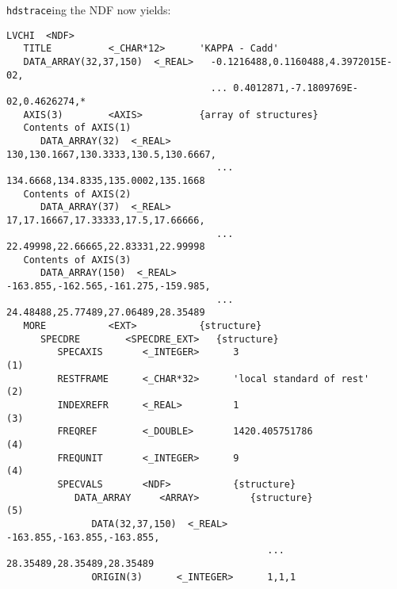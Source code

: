 {\tt hdstrace}ing the NDF now yields:

\small
\begin{verbatim}
LVCHI  <NDF>
   TITLE          <_CHAR*12>      'KAPPA - Cadd'
   DATA_ARRAY(32,37,150)  <_REAL>   -0.1216488,0.1160488,4.3972015E-02,
                                    ... 0.4012871,-7.1809769E-02,0.4626274,*
   AXIS(3)        <AXIS>          {array of structures}
   Contents of AXIS(1)
      DATA_ARRAY(32)  <_REAL>        130,130.1667,130.3333,130.5,130.6667,
                                     ... 134.6668,134.8335,135.0002,135.1668
   Contents of AXIS(2)
      DATA_ARRAY(37)  <_REAL>        17,17.16667,17.33333,17.5,17.66666,
                                     ... 22.49998,22.66665,22.83331,22.99998
   Contents of AXIS(3)
      DATA_ARRAY(150)  <_REAL>       -163.855,-162.565,-161.275,-159.985,
                                     ... 24.48488,25.77489,27.06489,28.35489
   MORE           <EXT>           {structure}
      SPECDRE        <SPECDRE_EXT>   {structure}
         SPECAXIS       <_INTEGER>      3                                   (1)
         RESTFRAME      <_CHAR*32>      'local standard of rest'            (2)
         INDEXREFR      <_REAL>         1                                   (3)
         FREQREF        <_DOUBLE>       1420.405751786                      (4)
         FREQUNIT       <_INTEGER>      9                                   (4)
         SPECVALS       <NDF>           {structure}
            DATA_ARRAY     <ARRAY>         {structure}                      (5)
               DATA(32,37,150)  <_REAL>       -163.855,-163.855,-163.855,
                                              ... 28.35489,28.35489,28.35489
               ORIGIN(3)      <_INTEGER>      1,1,1
 

\end{verbatim}
